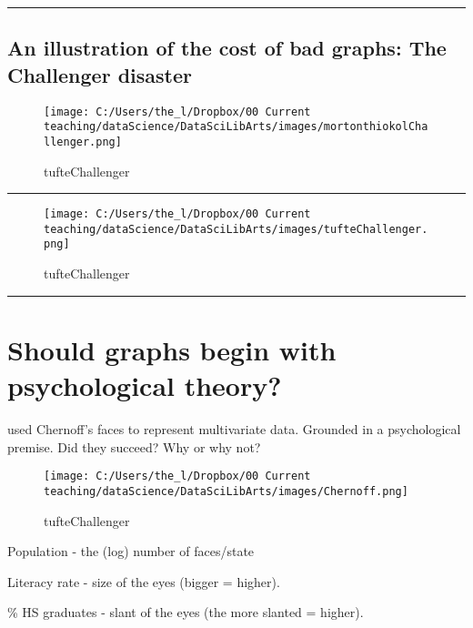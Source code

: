 \documentclass[]{book}
\theoremstyle{definition}
\theoremstyle{definition}
\theoremstyle{definition}
\theoremstyle{remark}
\begin{document}
\begin{center}\rule{0.5\linewidth}{\linethickness}\end{center}

\subsection{An illustration of the cost of bad graphs: The Challenger
disaster}\label{an-illustration-of-the-cost-of-bad-graphs-the-challenger-disaster}

\begin{figure}
\centering
\texttt{[image: C:/Users/the\_l/Dropbox/00 Current teaching/dataScience/DataSciLibArts/images/mortonthiokolChallenger.png]}
\caption{tufteChallenger}
\end{figure}

\begin{center}\rule{0.5\linewidth}{\linethickness}\end{center}

\begin{figure}
\centering
\texttt{[image: C:/Users/the\_l/Dropbox/00 Current teaching/dataScience/DataSciLibArts/images/tufteChallenger.png]}
\caption{tufteChallenger}
\end{figure}

\begin{center}\rule{0.5\linewidth}{\linethickness}\end{center}

\section{Should graphs begin with psychological
theory?}\label{should-graphs-begin-with-psychological-theory}

\citet{wainer1981graphical} used Chernoff's faces to represent
multivariate data. Grounded in a psychological premise. Did they
succeed? Why or why not?

\begin{figure}
\centering
\texttt{[image: C:/Users/the\_l/Dropbox/00 Current teaching/dataScience/DataSciLibArts/images/Chernoff.png]}
\caption{tufteChallenger}
\end{figure}

Population - the (log) number of faces/state

Literacy rate - size of the eyes (bigger = higher).

\% HS graduates - slant of the eyes (the more slanted = higher).
\end{document}
